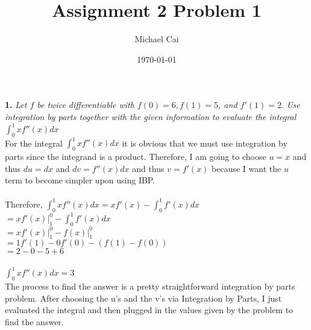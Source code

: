 \documentclass[11pt, oneside]{article}   	%
\title{Assignment 2 Problem 1}
\author{Michael Cai}
\date{\today}							%
\begin{document}
\maketitle

\noindent \textbf{1.} \textit{Let $f$ be twice differentiable with $f(0) = 6, f(1) = 5$, and $f'(1) = 2.$ Use integration by parts together with the given information to evaluate the integral} $\int_0^1 xf''(x) dx$\\

For the integral $\int_0^1 xf''(x)dx$ it is obvious that we must use integration by parts since the integrand is a product. Therefore, I am going to choose $u=x$ and thus $du = dx$ and $dv = f''(x)dx$ and thus $v = f'(x)$ because I want the $u$ term to become simpler upon using IBP. \\~\\
Therefore, $\int_0^1 xf''(x)dx = xf'(x) - \int_0^1 f'(x)dx$\\
$\left.  = xf'(x) \right|^0_1 - \int_0^1 f'(x)dx$\\
$\left.  =xf'(x) \right|^0_1 - \left. f(x) \right|^0_1$\\
$= 1f'(1) - 0f'(0) -(f(1)-f(0))$\\
$= 2 - 0 - 5 + 6$\\~\\
$\int_0^1 xf''(x)dx = 3$\\

The process to find the answer is a pretty straightforward integration by parts problem. After choosing the u's and the v's via Integration by Parts, I just evaluated the integral and then plugged in the values given by the problem to find the answer.

\end{document}
